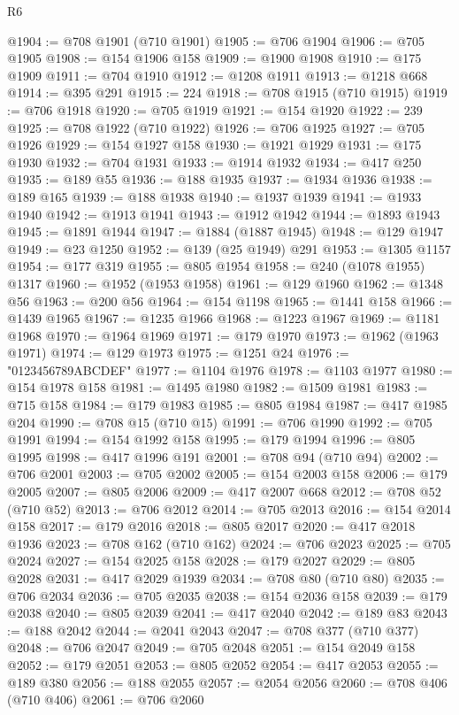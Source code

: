 \begin{lexlean}{R6}
\begin{coremodule}
{{{{{{{{{{{{{{{{{{{{{{{{{{{{{{{{{{{{{{{{{{{{{{{{{{{{{{{{{{{{{{{{{{{{{{{{@1904 := @708 @1901 (@710 @1901)
@1905 := @706 @1904
@1906 := @705 @1905
@1908 := @154 @1906 @158
@1909 := @1900 @1908
@1910 := @175 @1909
@1911 := @704 @1910
@1912 := @1208 @1911
@1913 := @1218 @668
@1914 := @395 @291
@1915 := 224
@1918 := @708 @1915 (@710 @1915)
@1919 := @706 @1918
@1920 := @705 @1919
@1921 := @154 @1920
@1922 := 239
@1925 := @708 @1922 (@710 @1922)
@1926 := @706 @1925
@1927 := @705 @1926
@1929 := @154 @1927 @158
@1930 := @1921 @1929
@1931 := @175 @1930
@1932 := @704 @1931
@1933 := @1914 @1932
@1934 := @417 @250
@1935 := @189 @55
@1936 := @188 @1935
@1937 := @1934 @1936
@1938 := @189 @165
@1939 := @188 @1938
@1940 := @1937 @1939
@1941 := @1933 @1940
@1942 := @1913 @1941
@1943 := @1912 @1942
@1944 := @1893 @1943
@1945 := @1891 @1944
@1947 := @1884 (@1887 @1945)
@1948 := @129 @1947
@1949 := @23 @1250
@1952 := @139 (@25 @1949) @291
@1953 := @1305 @1157
@1954 := @177 @319
@1955 := @805 @1954
@1958 := @240 (@1078 @1955) @1317
@1960 := @1952 (@1953 @1958)
@1961 := @129 @1960
@1962 := @1348 @56
@1963 := @200 @56
@1964 := @154 @1198
@1965 := @1441 @158
@1966 := @1439 @1965
@1967 := @1235 @1966
@1968 := @1223 @1967
@1969 := @1181 @1968
@1970 := @1964 @1969
@1971 := @179 @1970
@1973 := @1962 (@1963 @1971)
@1974 := @129 @1973
@1975 := @1251 @24
@1976 := "0123456789ABCDEF"
@1977 := @1104 @1976
@1978 := @1103 @1977
@1980 := @154 @1978 @158
@1981 := @1495 @1980
@1982 := @1509 @1981
@1983 := @715 @158
@1984 := @179 @1983
@1985 := @805 @1984
@1987 := @417 @1985 @204
@1990 := @708 @15 (@710 @15)
@1991 := @706 @1990
@1992 := @705 @1991
@1994 := @154 @1992 @158
@1995 := @179 @1994
@1996 := @805 @1995
@1998 := @417 @1996 @191
@2001 := @708 @94 (@710 @94)
@2002 := @706 @2001
@2003 := @705 @2002
@2005 := @154 @2003 @158
@2006 := @179 @2005
@2007 := @805 @2006
@2009 := @417 @2007 @668
@2012 := @708 @52 (@710 @52)
@2013 := @706 @2012
@2014 := @705 @2013
@2016 := @154 @2014 @158
@2017 := @179 @2016
@2018 := @805 @2017
@2020 := @417 @2018 @1936
@2023 := @708 @162 (@710 @162)
@2024 := @706 @2023
@2025 := @705 @2024
@2027 := @154 @2025 @158
@2028 := @179 @2027
@2029 := @805 @2028
@2031 := @417 @2029 @1939
@2034 := @708 @80 (@710 @80)
@2035 := @706 @2034
@2036 := @705 @2035
@2038 := @154 @2036 @158
@2039 := @179 @2038
@2040 := @805 @2039
@2041 := @417 @2040
@2042 := @189 @83
@2043 := @188 @2042
@2044 := @2041 @2043
@2047 := @708 @377 (@710 @377)
@2048 := @706 @2047
@2049 := @705 @2048
@2051 := @154 @2049 @158
@2052 := @179 @2051
@2053 := @805 @2052
@2054 := @417 @2053
@2055 := @189 @380
@2056 := @188 @2055
@2057 := @2054 @2056
@2060 := @708 @406 (@710 @406)
@2061 := @706 @2060
}}}}}}}}}}}}}}}}}}}}}}}}}}}}}}}}}}}}}}}}}}}}}}}}}}}}}}}}}}}}}}}}}}}}}}}}
\end{coremodule}
\end{lexlean}
